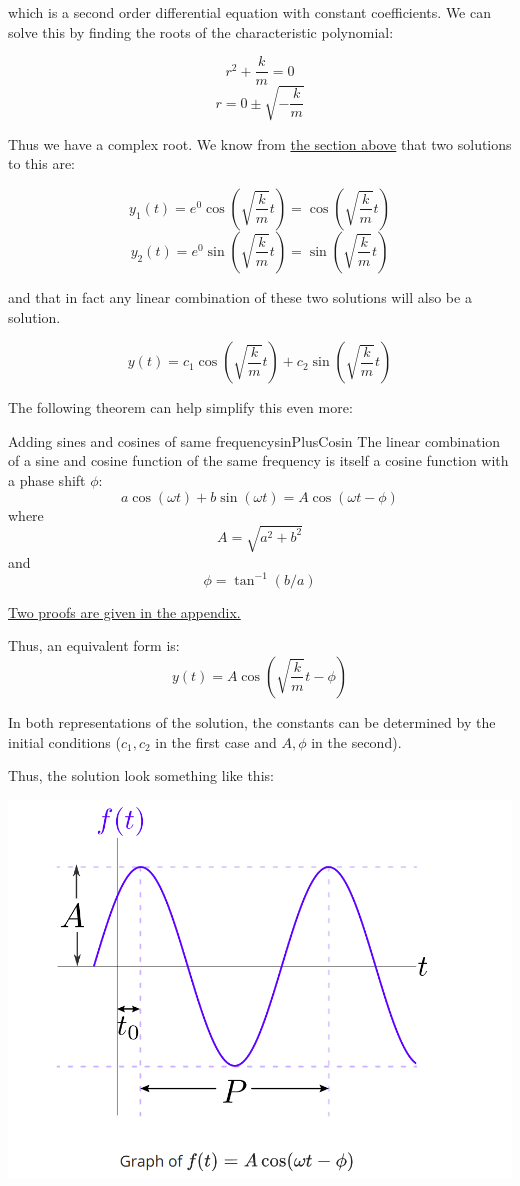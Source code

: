 \documentclass{report}
\begin{document}
which is a second order differential equation with constant coefficients. We can solve this by finding the roots of the characteristic polynomial:

$$r^2+\frac{k}{m} = 0$$
$$r = 0 \pm \sqrt{-\frac{k}{m}}$$

Thus we have a complex root. We know from \hyperref[sec:comRoot]{the section above} that two solutions to this are:

$$y_1(t) = e^0\cos(\sqrt{\frac{k}{m}}t) = \cos(\sqrt{\frac{k}{m}}t)$$
$$y_2(t) = e^0\sin(\sqrt{\frac{k}{m}}t) = \sin(\sqrt{\frac{k}{m}}t)$$

and that in fact any linear combination of these two solutions will also be a solution.

$$y(t) = c_1\cos(\sqrt{\frac{k}{m}}t) + c_2\sin(\sqrt{\frac{k}{m}}t)$$

The following theorem can help simplify this even more:

\begin{mytheo}{Adding sines and cosines of same frequency}{sinPlusCosin}
    The linear combination of a sine and cosine function of the same frequency is itself a cosine function with a phase shift $\phi$:
    $$a\cos(\omega t) + b\sin(\omega t) = A\cos(\omega t - \phi)$$
    where $$A = \sqrt{a^2+b^2}$$ and $$\phi = \tan^{-1}(b/a)$$
\end{mytheo}
\hyperref[sec:prSinPlusCosin]{Two proofs are given in the appendix.}

Thus, an equivalent form is:
$$y(t) = A\cos(\sqrt{\frac{k}{m}} t - \phi)$$

In both representations of the solution, the constants can be determined by the initial conditions ($c_1, c_2$ in the first case and $A, \phi$ in the second).

Thus, the solution look something like this:

\includegraphics[scale=0.4]{cos_phase.png}
\end{document}
